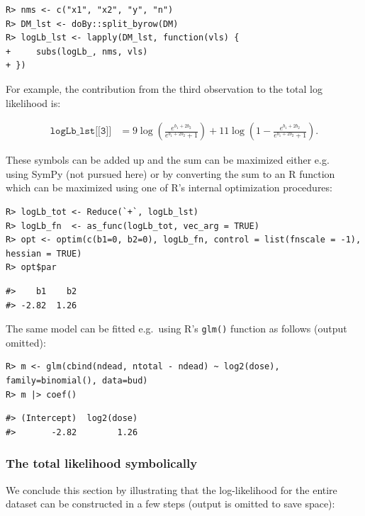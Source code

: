 \begin{verbatim}
R> nms <- c("x1", "x2", "y", "n")
R> DM_lst <- doBy::split_byrow(DM)
R> logLb_lst <- lapply(DM_lst, function(vls) {
+     subs(logLb_, nms, vls)
+ })
\end{verbatim}

For example, the contribution from the third observation to the total log likelihood is:

\begin{align}
\texttt{logLb\_lst[[3]]}  &= 9 \log{\left(\frac{e^{b_{1} + 2 b_{2}}}{e^{b_{1} + 2 b_{2}} + 1} \right)} + 11 \log{\left(1 - \frac{e^{b_{1} + 2 b_{2}}}{e^{b_{1} + 2 b_{2}} + 1} \right)}.
\end{align}

These
symbols can be added up and the sum can be maximized either e.g.\\
using SymPy (not pursued here) or by converting the sum to an R
function which can be maximized using one of R's internal
optimization procedures:

\begin{verbatim}
R> logLb_tot <- Reduce(`+`, logLb_lst) 
R> logLb_fn  <- as_func(logLb_tot, vec_arg = TRUE)
R> opt <- optim(c(b1=0, b2=0), logLb_fn, control = list(fnscale = -1), hessian = TRUE)
R> opt$par
\end{verbatim}

\begin{verbatim}
#>    b1    b2 
#> -2.82  1.26
\end{verbatim}

The same model can be fitted e.g.~using R's \texttt{glm()} function as follows (output omitted):

\begin{verbatim}
R> m <- glm(cbind(ndead, ntotal - ndead) ~ log2(dose), family=binomial(), data=bud)
R> m |> coef()
\end{verbatim}

\begin{verbatim}
#> (Intercept)  log2(dose) 
#>       -2.82        1.26
\end{verbatim}

\hypertarget{the-total-likelihood-symbolically}{%
\subsubsection{The total likelihood symbolically}\label{the-total-likelihood-symbolically}}

We conclude this section by illustrating that the log-likelihood for the entire dataset
can be constructed in a few steps (output is omitted to save space):

